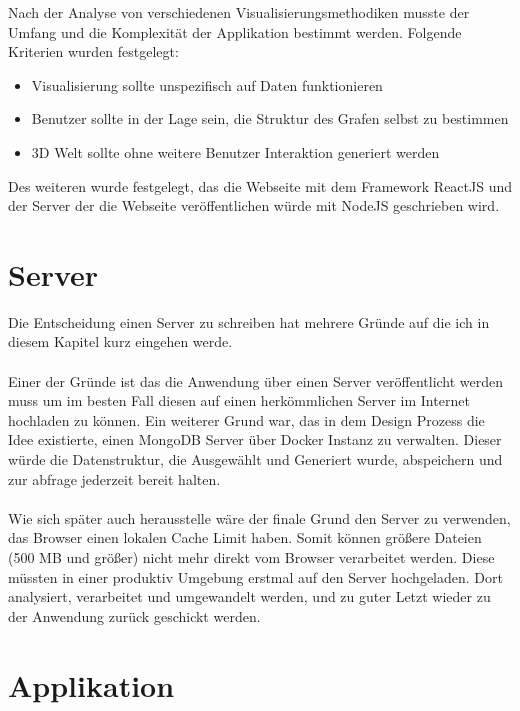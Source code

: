 
Nach der Analyse von verschiedenen Visualisierungsmethodiken musste der Umfang und die Komplexität der Applikation bestimmt werden.
Folgende Kriterien wurden festgelegt:
\begin{itemize}
    \item Visualisierung sollte unspezifisch auf Daten funktionieren
    \item Benutzer sollte in der Lage sein, die Struktur des Grafen selbst zu bestimmen
    \item 3D Welt sollte ohne weitere Benutzer Interaktion generiert werden
\end{itemize}
Des weiteren wurde festgelegt, das die Webseite mit dem Framework ReactJS und der Server der die Webseite veröffentlichen würde mit NodeJS geschrieben
wird.

\section{Server}
Die Entscheidung einen Server zu schreiben hat mehrere Gründe auf die ich in diesem Kapitel kurz eingehen werde. \\ \\
Einer der Gründe ist das die Anwendung über einen Server veröffentlicht werden muss um im besten Fall diesen auf einen herkömmlichen Server im
Internet hochladen zu können. Ein weiterer Grund war, das in dem Design Prozess die Idee existierte, einen MongoDB Server über Docker Instanz
zu verwalten. Dieser würde die Datenstruktur, die Ausgewählt und Generiert wurde, abspeichern und zur abfrage jederzeit bereit halten. \\ \\
Wie sich später auch herausstelle wäre der finale Grund den Server zu verwenden, das Browser einen lokalen Cache Limit haben. Somit können
größere Dateien (500 MB und größer) nicht mehr direkt vom Browser verarbeitet werden. Diese müssten in einer produktiv Umgebung erstmal auf
den Server hochgeladen. Dort analysiert, verarbeitet und umgewandelt werden, und zu guter Letzt wieder zu der Anwendung zurück geschickt
werden.

\section{Applikation}



